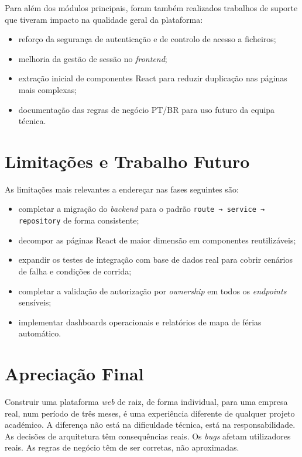 \documentclass[12pt, a4paper, twoside, openright]{report}
\begin{document}
Para além dos módulos principais, foram também realizados trabalhos de suporte que
tiveram impacto na qualidade geral da plataforma:

\begin{itemize}
  \item reforço da segurança de autenticação e de controlo de acesso a ficheiros;
  \item melhoria da gestão de sessão no \textit{frontend};
  \item extração inicial de componentes React para reduzir duplicação nas páginas
        mais complexas;
  \item documentação das regras de negócio PT/BR para uso futuro da equipa técnica.
\end{itemize}

\section{Limitações e Trabalho Futuro}

As limitações mais relevantes a endereçar nas fases seguintes são:

\begin{itemize}
  \item completar a migração do \textit{backend} para o padrão
        \texttt{route → service → repository} de forma consistente;
  \item decompor as páginas React de maior dimensão em componentes reutilizáveis;
  \item expandir os testes de integração com base de dados real para cobrir cenários
        de falha e condições de corrida;
  \item completar a validação de autorização por \textit{ownership} em todos os
        \textit{endpoints} sensíveis;
  \item implementar dashboards operacionais e relatórios de mapa de férias automático.
\end{itemize}

\section{Apreciação Final}

Construir uma plataforma \textit{web} de raiz, de forma individual, para uma empresa
real, num período de três meses, é uma experiência diferente de qualquer projeto
académico. A diferença não está na dificuldade técnica, está na responsabilidade.
As decisões de arquitetura têm consequências reais. Os \textit{bugs} afetam utilizadores
reais. As regras de negócio têm de ser corretas, não aproximadas.
\end{document}
